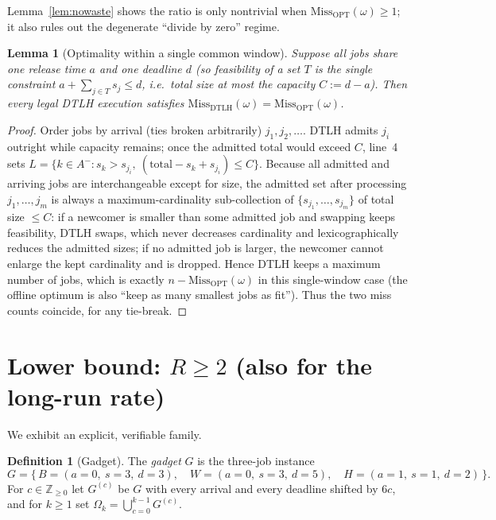 \documentclass{amsart}
\newtheorem{lemma}[theorem]{Lemma}
\theoremstyle{definition}
\newtheorem{definition}[theorem]{Definition}
\begin{document}
Lemma~\ref{lem:nowaste} shows the ratio is only nontrivial when
$\mathrm{Miss}_{\mathrm{OPT}}(\omega)\ge 1$; it also rules out the degenerate
``divide by zero'' regime.

\begin{lemma}[Optimality within a single common window]\label{lem:onewindow}
Suppose all jobs share one release time $a$ and one deadline $d$ (so feasibility
of a set $T$ is the single constraint $a+\sum_{j\in T}s_j\le d$, i.e.\ total size
at most the capacity $C:=d-a$). Then every legal DTLH execution satisfies
$\mathrm{Miss}_{\mathrm{DTLH}}(\omega)=\mathrm{Miss}_{\mathrm{OPT}}(\omega)$.
\end{lemma}

\begin{proof}
Order jobs by arrival (ties broken arbitrarily) $j_1,j_2,\dots$. DTLH admits
$j_i$ outright while capacity remains; once the admitted total would exceed $C$,
line~4 sets $L=\{k\in A^- : s_k>s_{j_i},\ (\text{total}-s_k+s_{j_i})\le C\}$.
Because all admitted and arriving jobs are interchangeable except for size, the
admitted set after processing $j_1,\dots,j_m$ is always a maximum-cardinality
sub-collection of $\{s_{j_1},\dots,s_{j_m}\}$ of total size $\le C$: if a
newcomer is smaller than some admitted job and swapping keeps feasibility, DTLH
swaps, which never decreases cardinality and lexicographically reduces the
admitted sizes; if no admitted job is larger, the newcomer cannot enlarge the
kept cardinality and is dropped. Hence DTLH keeps a maximum number of jobs, which
is exactly $n-\mathrm{Miss}_{\mathrm{OPT}}(\omega)$ in this single-window case
(the offline optimum is also ``keep as many smallest jobs as fit''). Thus the
two miss counts coincide, for any tie-break.
\end{proof}

\section{Lower bound: $R\ge 2$ (also for the long-run rate)}

We exhibit an explicit, verifiable family.

\begin{definition}[Gadget]\label{def:gadget}
The \emph{gadget} $G$ is the three-job instance
\[
G=\{\,B=(a{=}0,\ s{=}3,\ d{=}3),\quad
      W=(a{=}0,\ s{=}3,\ d{=}5),\quad
      H=(a{=}1,\ s{=}1,\ d{=}2)\,\}.
\]
For $c\in\mathbb{Z}_{\ge 0}$ let $G^{(c)}$ be $G$ with every arrival and every
deadline shifted by $6c$, and for $k\ge 1$ set
$\Omega_k=\bigcup_{c=0}^{k-1}G^{(c)}$.
\end{definition}
\end{document}
